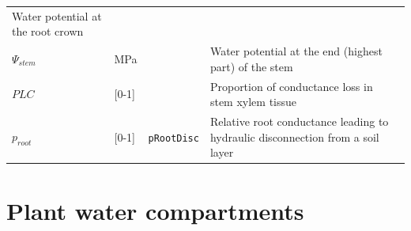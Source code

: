 \documentclass[]{book}
\begin{document}
\begin{longtable}[]{@{}llll@{}}
\begin{minipage}[t]{0.45\columnwidth}
Water potential at the root crown\strut
\end{minipage}\tabularnewline
\begin{minipage}[t]{0.11\columnwidth}\raggedright
\(\Psi_{stem}\)\strut
\end{minipage} & \begin{minipage}[t]{0.10\columnwidth}\raggedright
MPa\strut
\end{minipage} & \begin{minipage}[t]{0.12\columnwidth}\raggedright
\strut
\end{minipage} & \begin{minipage}[t]{0.45\columnwidth}\raggedright
Water potential at the end (highest part) of the stem\strut
\end{minipage}\tabularnewline
\begin{minipage}[t]{0.11\columnwidth}\raggedright
\(PLC\)\strut
\end{minipage} & \begin{minipage}[t]{0.10\columnwidth}\raggedright
{[}0-1{]}\strut
\end{minipage} & \begin{minipage}[t]{0.12\columnwidth}\raggedright
\strut
\end{minipage} & \begin{minipage}[t]{0.45\columnwidth}\raggedright
Proportion of conductance loss in stem xylem tissue\strut
\end{minipage}\tabularnewline
\begin{minipage}[t]{0.11\columnwidth}\raggedright
\(p_{root}\)\strut
\end{minipage} & \begin{minipage}[t]{0.10\columnwidth}\raggedright
{[}0-1{]}\strut
\end{minipage} & \begin{minipage}[t]{0.12\columnwidth}\raggedright
\texttt{pRootDisc}\strut
\end{minipage} & \begin{minipage}[t]{0.45\columnwidth}\raggedright
Relative root conductance leading to hydraulic disconnection from a soil layer\strut
\end{minipage}\tabularnewline
\bottomrule
\end{longtable}

\hypertarget{plant-water-compartments}{%
\section{Plant water compartments}\label{plant-water-compartments}}
\end{document}
